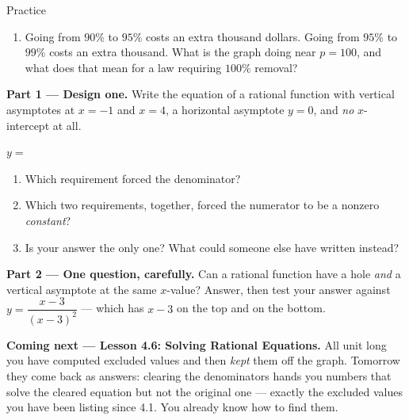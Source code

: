 \documentclass[10pt]{article}
\begin{document}
\begin{notesbox}{Practice}
\begin{enumerate}[leftmargin=1.9em, itemsep=10pt]
\begin{enumerate}[label=(\alph*), leftmargin=2.1em, itemsep=5pt]
      \item Going from $90\%$ to $95\%$ costs an extra \inblank{\blank{1.8cm}}{\gradedblank[id=q6n, type=short, points=1, answer={250}, check=numeric]{1.8cm-2pt}{10pt}} thousand dollars. Going from
            $95\%$ to $99\%$ costs an extra \inblank{\blank{1.8cm}}{\gradedblank[id=q6o, type=short, points=1, answer={2000}, check=numeric]{1.8cm-2pt}{10pt}} thousand. What is the graph doing near
            $p=100$, and what does that mean for a law requiring $100\%$ removal? 
    \end{enumerate}
\end{enumerate}
\end{notesbox}

\begin{extensionbox}
\textbf{Part 1 --- Design one.} Write the equation of a rational function with vertical asymptotes at
$x=-1$ and $x=4$, a horizontal asymptote $y=0$, and \emph{no} $x$-intercept at all.
\begin{center}
$y=$ \blank{5.0cm}
\end{center}
\begin{enumerate}[label=(\alph*), leftmargin=2.1em, itemsep=5pt]
  \item Which requirement forced the denominator? \blank{4.6cm}
  \item Which two requirements, together, forced the numerator to be a nonzero \emph{constant}?
        \writeline
  \item Is your answer the only one? What could someone else have written instead? \blank{4.6cm}
\end{enumerate}

\vspace{4pt}
\textbf{Part 2 --- One question, carefully.} Can a rational function have a hole \emph{and} a vertical
asymptote at the same $x$-value? Answer, then test your answer against $y=\dfrac{x-3}{(x-3)^2}$ ---
which has $x-3$ on the top and on the bottom.
\end{extensionbox}

\begin{spiralbox}
\textbf{Coming next --- Lesson 4.6: Solving Rational Equations.} All unit long you have computed
excluded values and then \emph{kept} them off the graph. Tomorrow they come back as answers: clearing
the denominators hands you numbers that solve the cleared equation but not the original one --- exactly
the excluded values you have been listing since 4.1. You already know how to find them.
\end{spiralbox}
\end{document}

